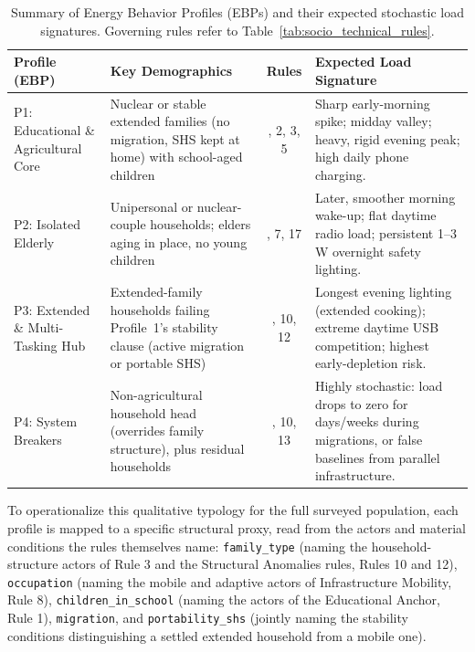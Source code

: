 \documentclass[final,3p,times,onecolumn]{elsarticle}
\begin{document}
\begin{table}[H]
\centering
\small
\setlength{\tabcolsep}{4pt}
\caption{Summary of Energy Behavior Profiles (EBPs) and their expected stochastic load signatures. Governing rules refer to Table~\ref{tab:socio_technical_rules}.}
\label{tab:ebp-summary}
\begin{tabular}{@{}>{\raggedright\arraybackslash}p{2.6cm}
                   >{\raggedright\arraybackslash}p{4.5cm}
                   >{\raggedright\arraybackslash}c
                   >{\raggedright\arraybackslash}p{4.5cm}@{}}
\toprule
\textbf{Profile (EBP)} & \textbf{Key Demographics} & \textbf{Rules} & \textbf{Expected Load Signature} \\
\midrule
P1: Educational \& Agricultural Core &
Nuclear or stable extended families (no migration, SHS kept at home) with school-aged children &
1, 2, 3, 5 &
Sharp early-morning spike; midday valley; heavy, rigid evening peak; high daily phone charging. \\
\addlinespace
P2: Isolated Elderly &
Unipersonal or nuclear-couple households; elders aging in place, no young children &
4, 7, 17 &
Later, smoother morning wake-up; flat daytime radio load; persistent 1--3\,W overnight safety lighting. \\
\addlinespace
P3: Extended \& Multi-Tasking Hub &
Extended-family households failing Profile~1's stability clause (active migration or portable SHS) &
3, 10, 12 &
Longest evening lighting (extended cooking); extreme daytime USB competition; highest early-depletion risk. \\
\addlinespace
P4: System Breakers &
Non-agricultural household head (overrides family structure), plus residual households &
8, 10, 13 &
Highly stochastic: load drops to zero for days/weeks during migrations, or false baselines from parallel infrastructure. \\
\bottomrule
\end{tabular}
\end{table}


To operationalize this qualitative typology for the full surveyed population, each profile is mapped to a specific structural proxy, read from the actors and material conditions the rules themselves name: \texttt{family\_type} (naming the household-structure actors of Rule 3 and the Structural Anomalies rules, Rules 10 and 12), \texttt{occupation} (naming the mobile and adaptive actors of Infrastructure Mobility, Rule 8), \texttt{children\_in\_school} (naming the actors of the Educational Anchor, Rule 1), \texttt{migration}, and \texttt{portability\_shs} (jointly naming the stability conditions distinguishing a settled extended household from a mobile one).
\end{document}
